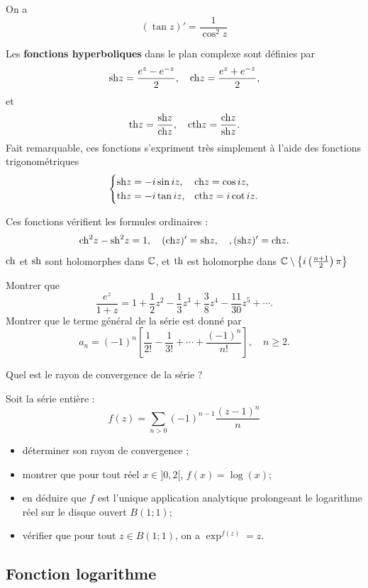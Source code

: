 On a \[ (\tan z)' = \frac{1}{\cos^2 z} \]

Les \textbf{fonctions hyperboliques} dans le plan complexe sont définies par
\[\mathrm{sh} z= \frac{e^z-e^{-z}}{2}, \quad \mathrm{ch} z= \frac{e^z+e^{-z}}{2},\]
et
\[\mathrm{th} z=\frac{\mathrm{sh} z}{\mathrm{ch} z}, \quad \mathrm{cth} z=\frac{\mathrm{ch} z}{\mathrm{sh} z}.\]
Fait remarquable, ces fonctions s'expriment très simplement à l'aide des fonctions trigonométriques
\[\begin{cases}
\mathrm{sh} z= - i \sin iz, & \mathrm{ch} z=\cos iz,\\
\mathrm{th} z= -i \tan i z, & \mathrm{cth} z=i \cot iz.
\end{cases}\]

Ces fonctions vérifient les formules ordinaires : 
\[\mathrm{ch} ^2 z-\mathrm{sh}^2 z = 1, \quad (\mathrm{ch} z)^\prime= \mathrm{sh} z, \quad, (\mathrm{sh} z)^\prime=\mathrm{ch} z.\] 
$\mathrm{ch}$ et $\mathrm{sh}$ sont holomorphes dans $\mathbb{C}$, et $\mathrm{th}$ est holomorphe dans $\mathbb{C} \setminus \big\{ i\left( \frac{n+1}{2} \right) \pi \big\}$

\begin{exercice}
Montrer que 
\[\frac{e^z}{1+z}=1+\frac{1}{2}z^2 - \frac{1}{3}z^3 + \frac{3}{8}z^4 -\frac{11}{30}z^5 + \cdots.\]
Montrer que le terme général de la série est donné par
\[a_n=(-1)^n \left[\frac{1}{2!} - \frac{1}{3!} + \cdots + \frac{(-1)^n}{n!}\right], \quad n \geq 2.\]

Quel est le rayon de convergence de la série ?
\end{exercice}

\begin{exercice} \label{ex:log}
Soit la série entière :
\[f(z)= \sum_{n >0}(-1)^{n-1}\frac{(z-1)^n}{n}
\]
\begin{itemize}
  \item déterminer son rayon de convergence ;
  \item montrer que pour tout réel $x \in ]0,2[$, $f(x)=\log(x)$;
  \item en déduire que $f$ est l'unique application analytique prolongeant le
  logarithme réel sur le disque ouvert $B(1 ; 1)$;
  \item vérifier que pour tout $z \in B(1 ;1)$, on a $\exp^{f(z)}=z$.
\end{itemize}
\end{exercice}






\subsection{Fonction logarithme}

